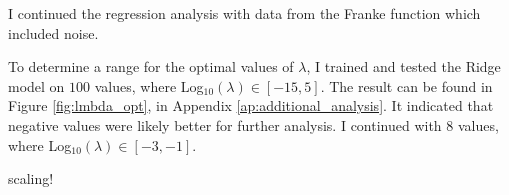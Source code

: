 I continued the regression analysis with data from the Franke function which included noise.

To determine a range for the optimal values of $\lambda$, I trained and tested the Ridge model on $100$ values, where Log$_{10}(\lambda) \in [-15, 5]$. The result can be found in Figure \ref{fig:lmbda_opt}, in Appendix \ref{ap:additional_analysis}. It indicated that negative values were likely better for further analysis. I continued with $8$ values, where Log$_{10}(\lambda) \in [-3, -1]$.

scaling!





















